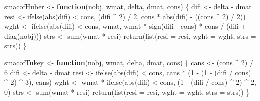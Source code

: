 \documentclass[
  12pt,
  letterpaper,
  DIV=11,
  numbers=noendperiod]{scrartcl}
\newenvironment{Shaded}{\begin{snugshade}}{\end{snugshade}}
\newcommand{\AttributeTok}[1]{\textcolor[rgb]{0.40,0.45,0.13}{#1}}
\newcommand{\ControlFlowTok}[1]{\textcolor[rgb]{0.00,0.23,0.31}{\textbf{#1}}}
\newcommand{\DecValTok}[1]{\textcolor[rgb]{0.68,0.00,0.00}{#1}}
\newcommand{\FunctionTok}[1]{\textcolor[rgb]{0.28,0.35,0.67}{#1}}
\newcommand{\NormalTok}[1]{\textcolor[rgb]{0.00,0.23,0.31}{#1}}
\newcommand{\OtherTok}[1]{\textcolor[rgb]{0.00,0.23,0.31}{#1}}
\newcommand{\SpecialCharTok}[1]{\textcolor[rgb]{0.37,0.37,0.37}{#1}}
\theoremstyle{plain}
\theoremstyle{remark}
\begin{document}
\begin{Shaded}
\begin{Highlighting}[]
\NormalTok{smacofHuber }\OtherTok{\textless{}{-}} \ControlFlowTok{function}\NormalTok{(nobj, wmat, delta, dmat, cons) \{}
\NormalTok{  difi }\OtherTok{\textless{}{-}}\NormalTok{ delta }\SpecialCharTok{{-}}\NormalTok{ dmat}
\NormalTok{  resi }\OtherTok{\textless{}{-}} \FunctionTok{ifelse}\NormalTok{(}\FunctionTok{abs}\NormalTok{(difi) }\SpecialCharTok{\textless{}}\NormalTok{ cons, (difi }\SpecialCharTok{\^{}} \DecValTok{2}\NormalTok{) }\SpecialCharTok{/} \DecValTok{2}\NormalTok{, cons }\SpecialCharTok{*} \FunctionTok{abs}\NormalTok{(difi) }\SpecialCharTok{{-}}\NormalTok{ ((cons }\SpecialCharTok{\^{}} \DecValTok{2}\NormalTok{) }\SpecialCharTok{/} \DecValTok{2}\NormalTok{))}
\NormalTok{  wght }\OtherTok{\textless{}{-}} \FunctionTok{ifelse}\NormalTok{(}\FunctionTok{abs}\NormalTok{(difi) }\SpecialCharTok{\textless{}}\NormalTok{ cons, wmat,}
\NormalTok{                 wmat }\SpecialCharTok{*} \FunctionTok{sign}\NormalTok{(difi }\SpecialCharTok{{-}}\NormalTok{ cons) }\SpecialCharTok{*}\NormalTok{ cons }\SpecialCharTok{/}\NormalTok{ (difi }\SpecialCharTok{+} \FunctionTok{diag}\NormalTok{(nobj)))}
\NormalTok{  strs }\OtherTok{\textless{}{-}} \FunctionTok{sum}\NormalTok{(wmat }\SpecialCharTok{*}\NormalTok{ resi)}
  \FunctionTok{return}\NormalTok{(}\FunctionTok{list}\NormalTok{(}\AttributeTok{resi =}\NormalTok{ resi, }\AttributeTok{wght =}\NormalTok{ wght, }\AttributeTok{strs =}\NormalTok{ strs))}
\NormalTok{\}}

\NormalTok{smacofTukey }\OtherTok{\textless{}{-}} \ControlFlowTok{function}\NormalTok{(nobj, wmat, delta, dmat, cons) \{}
\NormalTok{  cans }\OtherTok{\textless{}{-}}\NormalTok{ (cons }\SpecialCharTok{\^{}} \DecValTok{2}\NormalTok{) }\SpecialCharTok{/} \DecValTok{6}
\NormalTok{  difi }\OtherTok{\textless{}{-}}\NormalTok{ delta }\SpecialCharTok{{-}}\NormalTok{ dmat}
\NormalTok{  resi }\OtherTok{\textless{}{-}} \FunctionTok{ifelse}\NormalTok{(}\FunctionTok{abs}\NormalTok{(difi) }\SpecialCharTok{\textless{}}\NormalTok{ cons,}
\NormalTok{                 cans }\SpecialCharTok{*}\NormalTok{ (}\DecValTok{1} \SpecialCharTok{{-}}\NormalTok{ (}\DecValTok{1} \SpecialCharTok{{-}}\NormalTok{ (difi }\SpecialCharTok{/}\NormalTok{ cons) }\SpecialCharTok{\^{}} \DecValTok{2}\NormalTok{) }\SpecialCharTok{\^{}} \DecValTok{3}\NormalTok{), cans)}
\NormalTok{  wght }\OtherTok{\textless{}{-}}\NormalTok{ wmat }\SpecialCharTok{*} \FunctionTok{ifelse}\NormalTok{(}\FunctionTok{abs}\NormalTok{(difi) }\SpecialCharTok{\textless{}}\NormalTok{ cons,}
\NormalTok{                 (}\DecValTok{1} \SpecialCharTok{{-}}\NormalTok{ (difi }\SpecialCharTok{/}\NormalTok{ cons) }\SpecialCharTok{\^{}} \DecValTok{2}\NormalTok{) }\SpecialCharTok{\^{}} \DecValTok{2}\NormalTok{, }\DecValTok{0}\NormalTok{)}
\NormalTok{  strs }\OtherTok{\textless{}{-}} \FunctionTok{sum}\NormalTok{(wmat }\SpecialCharTok{*}\NormalTok{ resi)}
  \FunctionTok{return}\NormalTok{(}\FunctionTok{list}\NormalTok{(}\AttributeTok{resi =}\NormalTok{ resi, }\AttributeTok{wght =}\NormalTok{ wght, }\AttributeTok{strs =}\NormalTok{ strs))}
\NormalTok{\}}


\end{Highlighting}
\end{Shaded}
\end{document}
